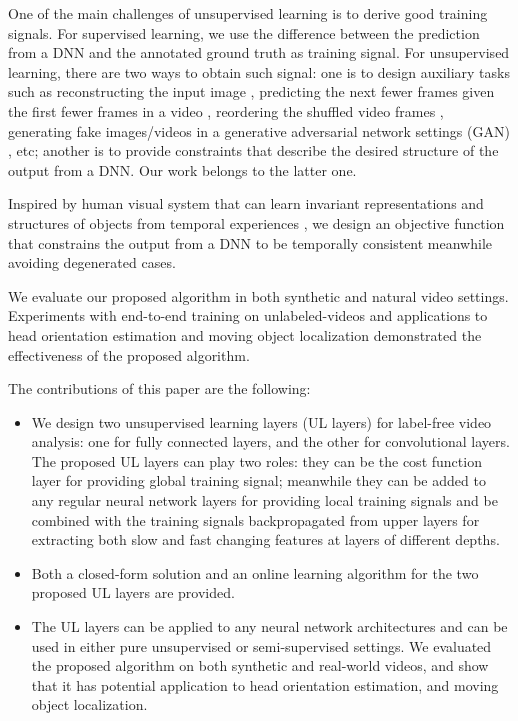 \documentclass{article}
\begin{document}
One of the main challenges of unsupervised learning is to derive good 
training signals. For supervised learning, we use the difference between the 
prediction from a DNN and the annotated ground truth as training signal. 
For unsupervised learning, there are two ways to obtain such signal: one is 
to design auxiliary tasks such as reconstructing the input image 
\cite{Hinton06b, Bengio07, Le12}, predicting the next fewer frames given the 
first fewer frames in a video \cite{Srivastava15, Finn16, Lotter16}, 
reordering the shuffled video frames \cite{Misra16}, generating fake 
images/videos in a generative adversarial network settings (GAN) 
\cite{Goodfellow14}, etc; another is to provide constraints 
\cite{Wiskott02, Higgins16, Lin16, Stewart17} that describe the desired structure of 
the output from a DNN. Our work belongs to the latter one.

Inspired by human visual system that can learn invariant representations and 
structures of objects from temporal experiences \cite{Foldiak91, Wiskott02}, 
we design an objective function that constrains the output from a DNN to be 
temporally consistent meanwhile avoiding degenerated cases.

We evaluate our proposed algorithm in both synthetic and natural video 
settings. 
Experiments with end-to-end training on unlabeled-videos and applications to 
head orientation estimation and moving object localization demonstrated the 
effectiveness of the proposed algorithm.

The contributions of this paper are the following:
\begin{itemize}
\item We design two unsupervised learning layers (UL layers) for label-free
 video analysis: one for fully connected layers, and the other for
convolutional layers. The proposed UL layers can play two roles: they can be
 the cost function layer for providing global training signal; meanwhile they
 can be added to any regular neural network layers for providing local training
signals and be combined with the training signals backpropagated from upper layers
for extracting both slow and fast changing features at layers of 
different depths.

\item Both a closed-form solution and an online learning algorithm for 
the two proposed UL layers are provided. 

\item The UL layers can be applied to any neural network architectures and 
 can be used in either pure unsupervised or semi-supervised settings.
We evaluated the proposed algorithm on both synthetic and real-world videos,
and show that it has potential application to head orientation estimation, and moving object localization.
\end{itemize}
\end{document}
